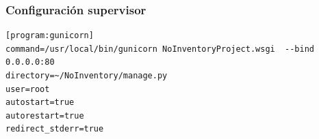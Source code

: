 \documentclass[a4paper,11pt]{book}
\begin{document}
\subsection{Configuración supervisor}\label{sec:supervisor}
\begin{lstlisting}
[program:gunicorn]
command=/usr/local/bin/gunicorn NoInventoryProject.wsgi  --bind 0.0.0.0:80
directory=~/NoInventory/manage.py
user=root
autostart=true
autorestart=true
redirect_stderr=true
\end{lstlisting}



%
%
%
%
%
%
%
%
%
%
%
%
%
%
%
%
%

%
%
%
\chapter*{}
\thispagestyle{empty}
\end{document}

